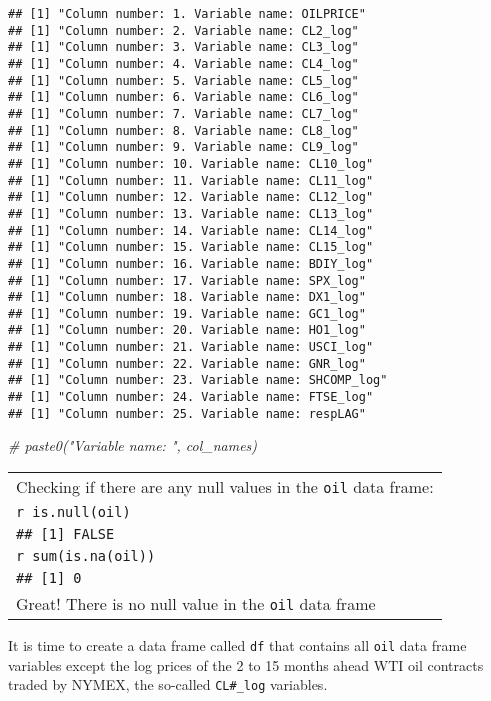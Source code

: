 \documentclass[
]{article}
\newenvironment{Shaded}{\begin{snugshade}}{\end{snugshade}}
\newcommand{\CommentTok}[1]{\textcolor[rgb]{0.56,0.35,0.01}{\textit{#1}}}
\begin{document}
\begin{verbatim}
## [1] "Column number: 1. Variable name: OILPRICE"
## [1] "Column number: 2. Variable name: CL2_log"
## [1] "Column number: 3. Variable name: CL3_log"
## [1] "Column number: 4. Variable name: CL4_log"
## [1] "Column number: 5. Variable name: CL5_log"
## [1] "Column number: 6. Variable name: CL6_log"
## [1] "Column number: 7. Variable name: CL7_log"
## [1] "Column number: 8. Variable name: CL8_log"
## [1] "Column number: 9. Variable name: CL9_log"
## [1] "Column number: 10. Variable name: CL10_log"
## [1] "Column number: 11. Variable name: CL11_log"
## [1] "Column number: 12. Variable name: CL12_log"
## [1] "Column number: 13. Variable name: CL13_log"
## [1] "Column number: 14. Variable name: CL14_log"
## [1] "Column number: 15. Variable name: CL15_log"
## [1] "Column number: 16. Variable name: BDIY_log"
## [1] "Column number: 17. Variable name: SPX_log"
## [1] "Column number: 18. Variable name: DX1_log"
## [1] "Column number: 19. Variable name: GC1_log"
## [1] "Column number: 20. Variable name: HO1_log"
## [1] "Column number: 21. Variable name: USCI_log"
## [1] "Column number: 22. Variable name: GNR_log"
## [1] "Column number: 23. Variable name: SHCOMP_log"
## [1] "Column number: 24. Variable name: FTSE_log"
## [1] "Column number: 25. Variable name: respLAG"
\end{verbatim}

\begin{Shaded}
\begin{Highlighting}[]
\CommentTok{\# paste0("Variable name: ", col\_names)}
\end{Highlighting}
\end{Shaded}

\begin{longtable}[]{@{}
  >{\raggedright\arraybackslash}p{}@{}}
\toprule
\endhead
Checking if there are any null values in the \texttt{oil} data frame: \\
\texttt{r\ is.null(oil)} \\
\texttt{\#\#\ {[}1{]}\ FALSE} \\
\texttt{r\ sum(is.na(oil))} \\
\texttt{\#\#\ {[}1{]}\ 0} \\
Great! There is no null value in the \texttt{oil} data frame \\
\bottomrule
\end{longtable}

It is time to create a data frame called \texttt{df} that contains all
\texttt{oil} data frame variables except the log prices of the 2 to 15
months ahead WTI oil contracts traded by NYMEX, the so-called
\texttt{CL\#\_log} variables.
\end{document}
